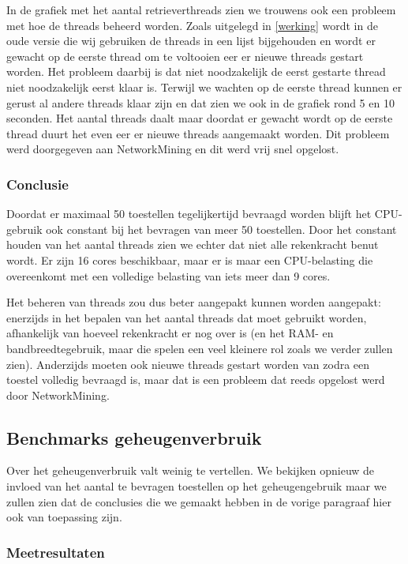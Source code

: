 In de grafiek met het aantal retrieverthreads zien we trouwens ook een probleem met hoe de threads beheerd worden.
Zoals uitgelegd in \cref{werking} wordt in de oude versie die wij gebruiken de threads in een lijst bijgehouden en wordt er
gewacht op de eerste thread om te voltooien eer er nieuwe threads gestart worden.
Het probleem daarbij is dat niet noodzakelijk de eerst gestarte thread niet noodzakelijk eerst klaar is.
Terwijl we wachten op de eerste thread kunnen er gerust al andere threads klaar zijn en dat zien we ook in de grafiek rond 5 en 10 seconden.
Het aantal threads daalt maar doordat er gewacht wordt op de eerste thread duurt het even eer er nieuwe threads aangemaakt worden.
Dit probleem werd doorgegeven aan NetworkMining en dit werd vrij snel opgelost.

\subsubsection{Conclusie}

Doordat er maximaal 50 toestellen tegelijkertijd bevraagd worden blijft het CPU-gebruik ook constant bij het bevragen van meer 50 toestellen.
Door het constant houden van het aantal threads zien we echter dat niet alle rekenkracht benut wordt.
Er zijn 16 cores beschikbaar, maar er is maar een CPU-belasting die overeenkomt met een volledige belasting van iets meer dan 9 cores.

Het beheren van threads zou dus beter aangepakt kunnen worden aangepakt:
enerzijds in het bepalen van het aantal threads dat moet gebruikt worden, afhankelijk van hoeveel rekenkracht er nog over is
(en het RAM- en bandbreedtegebruik, maar die spelen een veel kleinere rol zoals we verder zullen zien).
Anderzijds moeten ook nieuwe threads gestart worden van zodra een toestel volledig bevraagd is,
maar dat is een probleem dat reeds opgelost werd door NetworkMining.

\subsection{Benchmarks geheugenverbruik}

Over het geheugenverbruik valt weinig te vertellen.
We bekijken opnieuw de invloed van het aantal te bevragen toestellen op het geheugengebruik maar
we zullen zien dat de conclusies die we gemaakt hebben in de vorige paragraaf hier ook van toepassing zijn.

\subsubsection{Meetresultaten}

